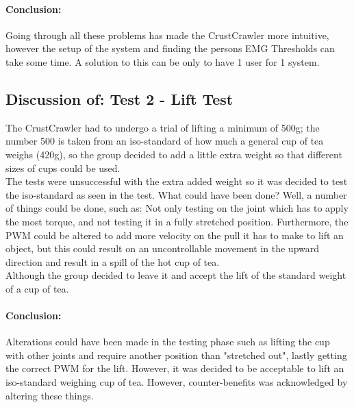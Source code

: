 \paragraph{Conclusion:} Going through all these problems has made the CrustCrawler more intuitive, however the setup of the system and finding the persons EMG Thresholds can take some time. A solution to this can be only to have 1 user for 1 system.  

\subsection*{Discussion of: Test 2 - Lift Test}
The CrustCrawler had to undergo a trial of lifting a minimum of 500g; the number 500 is taken from an iso-standard of how much a general cup of tea weighs (420g), so the group decided to add a little extra weight so that different sizes of cups could be used.\\
The tests were unsuccessful with the extra added weight so it was decided to test the iso-standard as seen in the test. What could have been done? Well, a number of things could be done, such as: Not only testing on the joint which has to apply the most torque, and not testing it in a fully stretched position. Furthermore, the PWM could be altered to add more velocity on the pull it has to make to lift an object, but this could result on an uncontrollable movement in the upward direction and result in a spill of the hot cup of tea.\\
Although the group decided to leave it and accept the lift of the standard weight of a cup of tea.
\paragraph{Conclusion:} Alterations could have been made in the testing phase such as lifting the cup with other joints and require another position than "stretched out", lastly getting the correct PWM for the lift. However, it was decided to be acceptable to lift an iso-standard weighing cup of tea. However, counter-benefits was acknowledged by altering these things.

